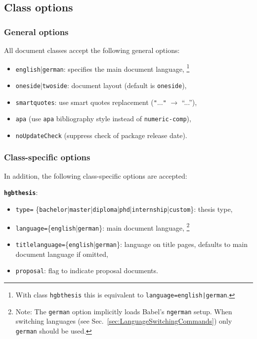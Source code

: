 \documentclass[english]{hgbarticle}
\begin{document}
\subsection{Class options}

\subsubsection{General options}

All document classes accept the following general options:
%
\begin{itemize}
    \item \texttt{english}|\texttt{german}: specifies the main document language,%
		\footnote{With class \texttt{hgbthesis} this is equivalent to \texttt{language=english|german}.}
	  \item \texttt{oneside}|\texttt{twoside}: document layout (default is \texttt{oneside}),
    \item \texttt{smartquotes}: use smart quotes replacement (\verb!"!...\verb!"! $\rightarrow$ ``...''),
    \item \texttt{apa} (use \texttt{apa} bibliography style instead of
    \texttt{numeric-comp}),
    \item \texttt{noUpdateCheck} (suppress check of package release date).
\end{itemize}


\subsubsection{Class-specific options}

In addition, the following class-specific options are accepted:

\noindent\textbf{\texttt{hgbthesis}}:
	\begin{itemize}
		\item \texttt{type=}%
			\{\texttt{bachelor}|\texttt{master}|\texttt{diploma}|\texttt{phd}|\texttt{internship}|\texttt{custom}\}:
				thesis type,
		\item \texttt{language=}\{\texttt{english}|\texttt{german}\}: main document language,%
			\footnote{Note: The \texttt{german} option implicitly loads Babel's \texttt{ngerman} setup. 
			When switching languages (see Sec.~\ref{sec:LanguageSwitchingCommands}) only \texttt{german}
			should be used.}
		\item \texttt{titlelanguage=}\{\texttt{english}|\texttt{german}\}: 
			language on title pages, defaults to main document language if omitted,
		\item \texttt{proposal}: flag to indicate proposal documents.
	\end{itemize}
\end{document}
